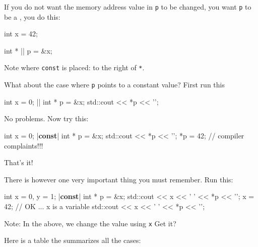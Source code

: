 If you do not want the memory address value in \texttt{p} to be changed, you want \texttt{p} to be a , you do this:

\begin{consolethree}[escapeinside=||]
int x = 42;

int * || p = &x;
\end{consolethree}
Note where \texttt{const} is placed: to the right of \texttt{*}.

What about the case where \texttt{p} points to a constant value? First run this

\begin{consolethree}[escapeinside=||]
int x = 0;
|| int * p = &x;
std::cout << *p << '\n';
\end{consolethree}
No problems. Now try this:

\begin{consolethree}[escapeinside=||]
int x = 0;
|\textbf{const}| int * p = &x;
std::cout << *p << '\n';
*p = 42; // compiler complaints!!!
\end{consolethree}
That's it!

There is however one very important thing you must remember. Run this:

\begin{consolethree}[escapeinside=||]
int x = 0, y = 1;
|\textbf{const}| int * p = &x;
std::cout << x << ' ' << *p << '\n';
x = 42;                  // OK ... x is a variable
std::cout << x << ' ' << *p << '\n';
\end{consolethree}

Note:  In the above, we change the value using \texttt{x} Get it?

Here is a table the summarizes all the cases:






